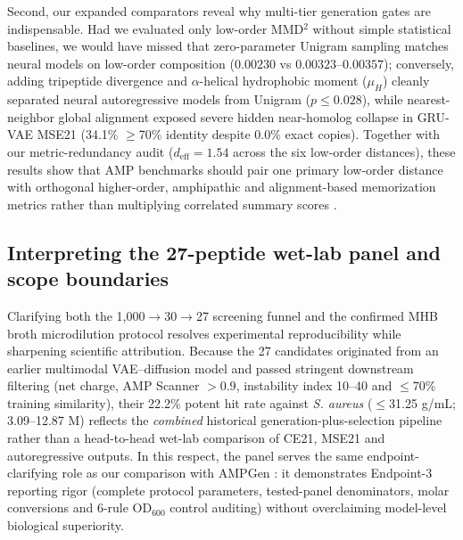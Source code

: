 \documentclass[unnumsec,webpdf,contemporary,large]{oup-authoring-template}
\newcommand{\rev}[1]{#1}
\begin{document}
\rev{Second, our expanded comparators reveal why multi-tier generation gates are indispensable. Had we evaluated only low-order MMD$^2$ without simple statistical baselines, we would have missed that zero-parameter Unigram sampling matches neural models on low-order composition ($0.00230$ vs $0.00323\text{--}0.00357$); conversely, adding tripeptide divergence and $\alpha$-helical hydrophobic moment ($\mu_H$) cleanly separated neural autoregressive models from Unigram ($p\leq 0.028$), while nearest-neighbor global alignment exposed severe hidden near-homolog collapse in GRU-VAE MSE21 (34.1\% $\geq$70\% identity despite 0.0\% exact copies). Together with our metric-redundancy audit ($d_{\mathrm{eff}}=1.54$ across the six low-order distances), these results show that AMP benchmarks should pair one primary low-order distance with orthogonal higher-order, amphipathic and alignment-based memorization metrics rather than multiplying correlated summary scores \cite{ref4,ref5,ref43,ref45}.}

\rev{\subsection{Interpreting the 27-peptide wet-lab panel and scope boundaries}}

\rev{Clarifying both the 1,000$\rightarrow$30$\rightarrow$27 screening funnel and the confirmed MHB broth microdilution protocol resolves experimental reproducibility while sharpening scientific attribution. Because the 27 candidates originated from an earlier multimodal VAE--diffusion model and passed stringent downstream filtering (net charge, AMP Scanner $>0.9$, instability index 10--40 and $\leq$70\% training similarity), their 22.2\% potent hit rate against \textit{S. aureus} ($\leq$31.25 \textmu{}g/mL; 3.09--12.87 \textmu{}M) reflects the \emph{combined} historical generation-plus-selection pipeline rather than a head-to-head wet-lab comparison of CE21, MSE21 and autoregressive outputs. In this respect, the panel serves the same endpoint-clarifying role as our comparison with AMPGen \cite{ref9}: it demonstrates Endpoint-3 reporting rigor (complete protocol parameters, tested-panel denominators, molar conversions and 6-rule OD$_{600}$ control auditing) without overclaiming model-level biological superiority.}
\end{document}
